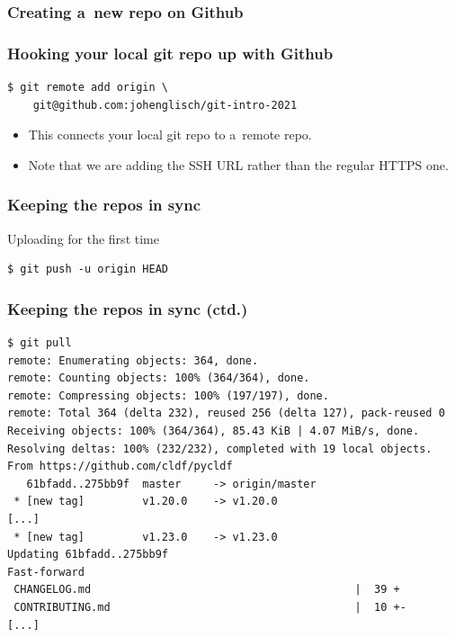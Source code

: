 \documentclass[12pt]{beamer}
\begin{document}
\begin{frame}
  \frametitle{Creating a~new repo on Github}

\end{frame}

\begin{frame}[fragile]
  \frametitle{Hooking your local git repo up with Github}

  {\footnotesize{}%
    \begin{verbatim}
$ git remote add origin \
    git@github.com:johenglisch/git-intro-2021
    \end{verbatim}%
  }
  \begin{itemize}
    \item This connects your \alert{local} git repo to a~\alert{remote} repo.
    \item Note that we are adding the SSH URL rather than the regular HTTPS one.
  \end{itemize}
\end{frame}

\begin{frame}[fragile]
  \frametitle{Keeping the repos in sync}

  \begin{block}{Uploading for the first time}
    {\footnotesize{}%
      \begin{verbatim}
$ git push -u origin HEAD
      \end{verbatim}%
    }
  \end{block}
\end{frame}

\begin{frame}[fragile]
  \frametitle{Keeping the repos in sync (ctd.)}

  {\footnotesize{}%
    \begin{verbatim}
$ git pull
remote: Enumerating objects: 364, done.
remote: Counting objects: 100% (364/364), done.
remote: Compressing objects: 100% (197/197), done.
remote: Total 364 (delta 232), reused 256 (delta 127), pack-reused 0
Receiving objects: 100% (364/364), 85.43 KiB | 4.07 MiB/s, done.
Resolving deltas: 100% (232/232), completed with 19 local objects.
From https://github.com/cldf/pycldf
   61bfadd..275bb9f  master     -> origin/master
 * [new tag]         v1.20.0    -> v1.20.0
[...]
 * [new tag]         v1.23.0    -> v1.23.0
Updating 61bfadd..275bb9f
Fast-forward
 CHANGELOG.md                                         |  39 +
 CONTRIBUTING.md                                      |  10 +-
[...]
    \end{verbatim}
  }
\end{frame}
\end{document}
